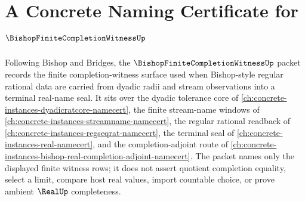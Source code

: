 \chapter{A Concrete Naming Certificate for $\BishopFiniteCompletionWitnessUp$}
\label{ch:concrete-instances-bishop-finite-completion-witness-namecert}

Following Bishop and Bridges, the $\BishopFiniteCompletionWitnessUp$ packet records the finite completion-witness surface used when Bishop-style regular rational data are carried from dyadic radii and stream observations into a terminal real-name seal. It sits over the dyadic tolerance core of \autoref{ch:concrete-instances-dyadicratcore-namecert}, the finite stream-name windows of \autoref{ch:concrete-instances-streamname-namecert}, the regular rational readback of \autoref{ch:concrete-instances-regseqrat-namecert}, the terminal seal of \autoref{ch:concrete-instances-real-namecert}, and the completion-adjoint route of \autoref{ch:concrete-instances-bishop-real-completion-adjoint-namecert}. The packet names only the displayed finite witness rows; it does not assert quotient completion equality, select a limit, compare host real values, import countable choice, or prove ambient $\RealUp$ completeness.

